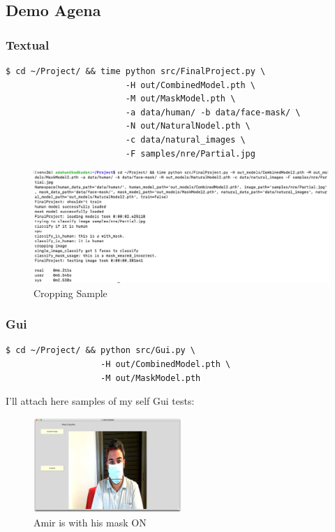 \subsection{Demo Agena}
\subsubsection{Textual}
\begin{verbatim}
$ cd ~/Project/ && time python src/FinalProject.py \
                        -H out/CombinedModel.pth \
                        -M out/MaskModel.pth \
                        -a data/human/ -b data/face-mask/ \
                        -N out/NaturalNodel.pth \
                        -c data/natural_images \
                        -F samples/nre/Partial.jpg
\end{verbatim}
\begin{figure}[H]
    \centering
    \includegraphics[width=1\textwidth]{images/Demo/Textual.png}
    \caption{Cropping Sample}
    \label{fig:Textual}
\end{figure}
\subsubsection{Gui}
\begin{verbatim}
$ cd ~/Project/ && python src/Gui.py \
                   -H out/CombinedModel.pth \
                   -M out/MaskModel.pth
\end{verbatim}
I'll attach here samples of my self Gui tests:
\begin{figure}[H]
    \centering
    \includegraphics[width=0.5\textwidth]{images/Demo/Masked.png}
    \caption{Amir is with his mask ON}
    \label{fig:MaskedAmir}
\end{figure}

